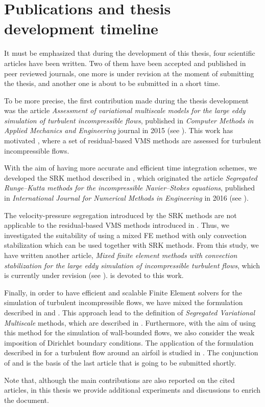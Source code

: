 \section{Publications and thesis development timeline}

It must be emphasized that during the development of this thesis, four scientific articles have been written. Two of them have been accepted and published in peer reviewed journals, one more is under revision at the moment of submitting the thesis, and another one is about to be submitted in a short time. 

To be more precise, the first contribution made during the thesis development was the article \textit{Assessment of variational multiscale models for the large eddy simulation of turbulent incompressible flows}, published in \textit{Computer Methods in Applied Mechanics and Engineering} journal in 2015 (see \cite{colomes_assessment_2015}). This work has motivated , where a set of residual-based VMS methods are assessed for turbulent incompressible flows.

With the aim of having more accurate and efficient time integration schemes, we developed the SRK method described in , which originated the article \textit{Segregated Runge–Kutta methods for the incompressible Navier–Stokes equations}, published in \textit{International Journal for Numerical Methods in Engineering} in 2016 (see \cite{colomes_segregated_2015}).

The velocity-pressure segregation introduced by the SRK methods are not applicable to the residual-based VMS methods introduced in . Thus, we investigated the suitability of using a mixed FE method with only convection stabilization which can be used together with SRK methods. From this study, we have written another article, \textit{Mixed finite element methods with convection stabilization for the large eddy simulation of incompressible turbulent flows}, which is currently under revision (see \cite{colomes_mixed_2015}).  is devoted to this work.

Finally, in order to have efficient and scalable Finite Element solvers for the simulation of turbulent incompressible flows, we have mixed the formulation described in  and . This approach lead to the definition of \textit{Segregated Variational Multiscale} methods, which are described in . Furthermore, with the aim of using this method for the simulation of wall-bounded flows, we also consider the weak imposition of Dirichlet boundary conditions. The application of the formulation described in  for a turbulent flow around an airfoil is studied in . The conjunction of  and  is the basis of the last article that is going to be submitted shortly.

Note that, although the main contributions are also reported on the cited articles, in this thesis we provide additional experiments and discussions to enrich the document.
